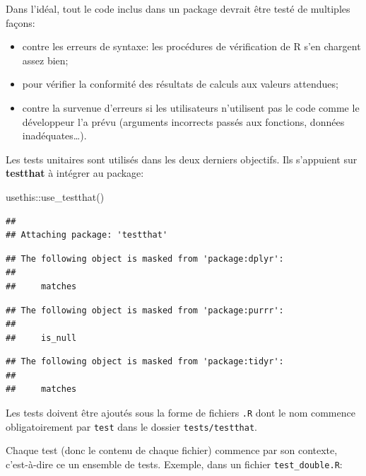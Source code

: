 \documentclass[
  11pt,
  french,
  a4paper,
  extrafontsizes,onecolumn,openright
  ]{memoir}
\newenvironment{Shaded}{\begin{snugshade}}{\end{snugshade}}
\newcommand{\FunctionTok}[1]{\textcolor[rgb]{0.00,0.00,0.00}{#1}}
\newcommand{\NormalTok}[1]{#1}
\newcommand{\SpecialCharTok}[1]{\textcolor[rgb]{0.00,0.00,0.00}{#1}}
\providecommand{\tightlist}{%
  \setlength{\itemsep}{0pt}\setlength{\parskip}{0pt}}
\begin{document}
Dans l'idéal, tout le code inclus dans un package devrait être testé de multiples façons:

\begin{itemize}
\tightlist
\item
  contre les erreurs de syntaxe: les procédures de vérification de R s'en chargent assez bien;
\item
  pour vérifier la conformité des résultats de calculs aux valeurs attendues;
\item
  contre la survenue d'erreurs si les utilisateurs n'utilisent pas le code comme le développeur l'a prévu (arguments incorrects passés aux fonctions, données inadéquates\ldots).
\end{itemize}

Les tests unitaires sont utilisés dans les deux derniers objectifs.
Ils s'appuient sur \textbf{testthat} à intégrer au package:

\scriptsize

\begin{Shaded}
\begin{Highlighting}[]
\NormalTok{usethis}\SpecialCharTok{::}\FunctionTok{use\_testthat}\NormalTok{()}
\end{Highlighting}
\end{Shaded}

\normalsize

\scriptsize

\begin{verbatim}
## 
## Attaching package: 'testthat'
\end{verbatim}

\begin{verbatim}
## The following object is masked from 'package:dplyr':
## 
##     matches
\end{verbatim}

\begin{verbatim}
## The following object is masked from 'package:purrr':
## 
##     is_null
\end{verbatim}

\begin{verbatim}
## The following object is masked from 'package:tidyr':
## 
##     matches
\end{verbatim}

\normalsize

Les tests doivent être ajoutés sous la forme de fichiers \texttt{.R} dont le nom commence obligatoirement par \texttt{test} dans le dossier \texttt{tests/testthat}.

Chaque test (donc le contenu de chaque fichier) commence par son contexte, c'est-à-dire ce un ensemble de tests. Exemple, dans un fichier \texttt{test\_double.R}:
\end{document}
